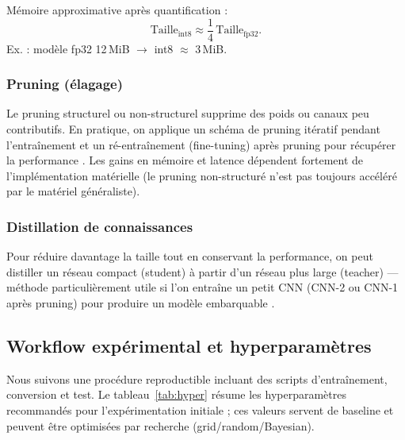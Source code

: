   Mémoire approximative après quantification :
  \[
  \text{Taille}_{\text{int8}} \approx \frac{1}{4}\,\text{Taille}_{\text{fp32}}.
  \]
  Ex. : modèle fp32 12\,MiB \(\rightarrow\) int8 \(\approx\) 3\,MiB.

  \subsubsection{Pruning (élagage)}

  Le pruning structurel ou non-structurel supprime des poids ou canaux peu contributifs. En pratique, on applique un schéma de pruning itératif pendant l'entraînement et un ré-entraînement (fine-tuning) après pruning pour récupérer la performance \autocite{hinton2015distillation}. Les gains en mémoire et latence dépendent fortement de l'implémentation matérielle (le pruning non-structuré n'est pas toujours accéléré par le matériel généraliste).

  \subsubsection{Distillation de connaissances}

  Pour réduire davantage la taille tout en conservant la performance, on peut distiller un réseau compact (student) à partir d'un réseau plus large (teacher) — méthode particulièrement utile si l’on entraîne un petit CNN (CNN-2 ou CNN-1 après pruning) pour produire un modèle embarquable \autocite{hinton2015distillation}.

  \subsection{Workflow expérimental et hyperparamètres}

  Nous suivons une procédure reproductible incluant des scripts d'entraînement, conversion et test. Le tableau~\ref{tab:hyper} résume les hyperparamètres recommandés pour l'expérimentation initiale ; ces valeurs servent de baseline et peuvent être optimisées par recherche (grid/random/Bayesian).


